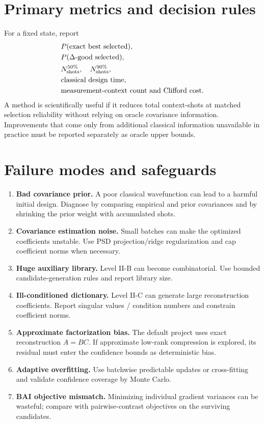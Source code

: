 \documentclass[11pt]{article}
\begin{document}
\section{Primary metrics and decision rules}

For a fixed state, report
\begin{align}
  &P(\text{exact best selected}),\\
  &P(\Delta\text{-good selected}),\\
  &N_{\rm shots}^{50\%},\quad N_{\rm shots}^{90\%},\\
  &\text{classical design time},\\
  &\text{measurement-context count and Clifford cost}.
\end{align}
A method is scientifically useful if it reduces total context-shots at matched selection reliability without relying on oracle covariance information.  Improvements that come only from additional classical information unavailable in practice must be reported separately as oracle upper bounds.

\section{Failure modes and safeguards}

\begin{enumerate}[label=(\arabic*)]
  \item \textbf{Bad covariance prior.}  A poor classical wavefunction can lead to a harmful initial design.  Diagnose by comparing empirical and prior covariances and by shrinking the prior weight with accumulated shots.
  \item \textbf{Covariance estimation noise.}  Small batches can make the optimized coefficients unstable.  Use PSD projection/ridge regularization and cap coefficient norms when necessary.
  \item \textbf{Huge auxiliary library.}  Level II-B can become combinatorial.  Use bounded candidate-generation rules and report library size.
  \item \textbf{Ill-conditioned dictionary.}  Level II-C can generate large reconstruction coefficients.  Report singular values / condition numbers and constrain coefficient norms.
  \item \textbf{Approximate factorization bias.}  The default project uses exact reconstruction $A=BC$.  If approximate low-rank compression is explored, its residual must enter the confidence bounds as deterministic bias.
  \item \textbf{Adaptive overfitting.}  Use batchwise predictable updates or cross-fitting and validate confidence coverage by Monte Carlo.
  \item \textbf{BAI objective mismatch.}  Minimizing individual gradient variances can be wasteful; compare with pairwise-contrast objectives on the surviving candidates.
\end{enumerate}
\end{document}
